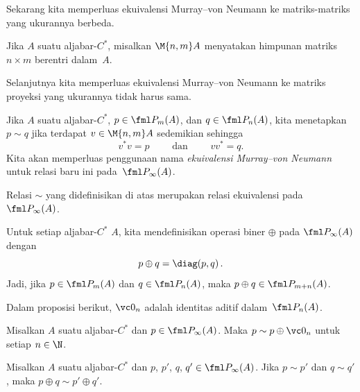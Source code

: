 Sekarang kita memperluas ekuivalensi Murray--von Neumann ke matriks-matriks yang ukurannya berbeda.

\begin{notn} Jika $A$ suatu aljabar-$C^*$, misalkan
$\M {n,m}A$ menyatakan himpunan matriks $n \times m$ berentri dalam~$A$.
\end{notn}

Selanjutnya kita memperluas ekuivalensi Murray--von Neumann ke matriks proyeksi yang ukurannya tidak harus sama.

\begin{defn}\label{0060316fa} Jika $A$ suatu aljabar-$C^*$, $p \in \fml P_m(A)$, dan $q \in \fml P_n(A)$, kita menetapkan
$p \sim q$ jika terdapat $v \in \M {n,m}A$ sedemikian sehingga
  \[ v^*v = p \qquad\text{ dan } \qquad  vv^* = q. \]
Kita akan memperluas penggunaan nama \emph{ekuivalensi Murray--von Neumann} untuk relasi baru ini pada~$\fml P_\infty(A)$.
\end{defn}

\begin{prop}\label{0060317} Relasi $\sim$ yang didefinisikan di atas merupakan relasi
ekuivalensi pada~$\fml P_\infty(A)$.
\end{prop}

\begin{defn} Untuk setiap aljabar-$C^*$ $A$, kita mendefinisikan operasi biner $\oplus$ pada $\fml
P_\infty(A)$ dengan
   \[ p \oplus q = \diag(p,q)\,. \]
Jadi, jika $p \in \fml P_m(A)$ dan $q \in \fml P_n(A)$, maka $p \oplus q \in \fml
P_{m+n}(A)$.
\end{defn}

Dalam proposisi berikut, $\vc 0_n$ adalah identitas aditif dalam~$\fml P_n(A)$.

\begin{prop}\label{0060324} Misalkan $A$ suatu aljabar-$C^*$ dan $p \in \fml P_\infty(A)$.
Maka $p \sim p \oplus \vc 0_n$ untuk setiap $n \in \N$.
\end{prop}

\begin{prop}\label{0060327} Misalkan $A$ suatu aljabar-$C^*$ dan $p$, $p'$, $q$, $q' \in
\fml P_\infty(A)$. Jika $p \sim p'$ dan $q \sim q'$, maka $p \oplus q \sim p' \oplus q'$.
\end{prop}

